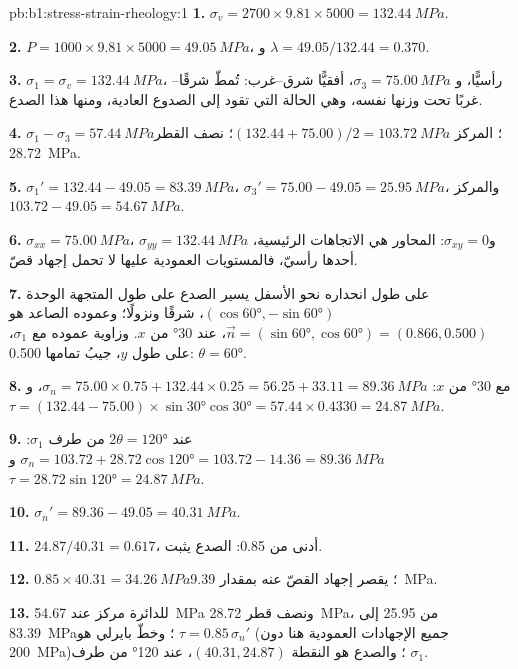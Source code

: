 \begin{solution}{pb:b1:stress-strain-rheology:1}
\textbf{1.} $\sigma_v = 2700\times9.81\times5000 = \qty{132.44}{MPa}$.

\textbf{2.} $P = 1000\times9.81\times5000 = \qty{49.05}{MPa}$، و
$\lambda = 49.05/132.44 = 0.370$.

\textbf{3.} $\sigma_1 = \sigma_v = \qty{132.44}{MPa}$، رأسيًّا، و
$\sigma_3 = \qty{75.00}{MPa}$، أفقيًّا شرق--غرب:  تُمطّ شرقًا--غربًا تحت وزنها نفسه، وهي الحالة التي تقود إلى الصدوع العادية، ومنها هذا الصدع.

\textbf{4.} $\sigma_1 - \sigma_3 = \qty{57.44}{MPa}$؛ المركز
$(132.44 + 75.00)/2 = \qty{103.72}{MPa}$؛ نصف القطر \qty{28.72}{MPa}.

\textbf{5.} $\sigma_1' = 132.44 - 49.05 = \qty{83.39}{MPa}$، $\sigma_3' =
75.00 - 49.05 = \qty{25.95}{MPa}$، والمركز $103.72 - 49.05 = \qty{54.67}{MPa}$.

\textbf{6.} $\sigma_{xx} = \qty{75.00}{MPa}$، $\sigma_{yy} = \qty{132.44}{MPa}$
و$\sigma_{xy} = 0$: المحاور هي الاتجاهات الرئيسية، أحدها رأسيّ، فالمستويات العمودية عليها لا تحمل إجهاد قصّ.

\textbf{7.} على طول انحداره نحو الأسفل يسير الصدع على طول المتجهة الوحدة
$(\cos\ang{60}, -\sin\ang{60})$، شرقًا ونزولًا؛ وعموده الصاعد هو
$\vec n = (\sin\ang{60}, \cos\ang{60}) = (0.866, 0.500)$، عند \ang{30} من
$x$. وزاوية عموده مع $\sigma_1$، على طول $y$، جيبُ تمامها
0.500: $\theta = \ang{60}$.

\textbf{8.} مع \ang{30} من $x$: $\sigma_n = 75.00\times0.75 + 132.44\times0.25
= 56.25 + 33.11 = \qty{89.36}{MPa}$، و$\tau = (132.44 - 75.00)\times
\sin\ang{30}\cos\ang{30} = 57.44\times0.4330 = \qty{24.87}{MPa}$.

\textbf{9.} عند $2\theta = \ang{120}$ من طرف $\sigma_1$:
$\sigma_n = 103.72 + 28.72\cos\ang{120} = 103.72 - 14.36 = \qty{89.36}{MPa}$
و$\tau = 28.72\sin\ang{120} = \qty{24.87}{MPa}$.

\textbf{10.} $\sigma_n' = 89.36 - 49.05 = \qty{40.31}{MPa}$.

\textbf{11.} $24.87/40.31 = 0.617$، أدنى من 0.85: الصدع يثبت.

\textbf{12.} $0.85\times40.31 = \qty{34.26}{MPa}$؛ يقصر إجهاد القصّ عنه بمقدار \qty{9.39}{MPa}.

\textbf{13.} للدائرة مركز عند \qty{54.67}{MPa} ونصف قطر
\qty{28.72}{MPa}، من \num{25.95} إلى \qty{83.39}{MPa}؛ وخطّ بايرلي هو
$\tau = 0.85\,\sigma_n'$ (جميع الإجهادات العمودية هنا دون
\qty{200}{MPa})؛ والصدع هو النقطة $(40.31, 24.87)$، عند \ang{120} من
طرف $\sigma_1$.


\end{solution}
